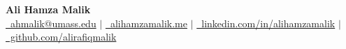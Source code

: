 \begin{center}
    \textbf{\huge Ali Hamza Malik} \\ \vspace{5pt}
    \small
    \href{mailto:ahmalik@umass.edu}{\raisebox{-0.05\height}\faEnvelope \ ahmalik@umass.edu}
      $|$ \href{https://alihamzamalik.me/}{{\raisebox{-0.05\height}\faGlobeAmericas\ alihamzamalik.me}}
      $|$
      \href{https://linkedin.com/in/alihamzamalik}{\raisebox{-0.05\height}\faLinkedin\ linkedin.com/in/alihamzamalik}
      $|$ \href{https://github.com/alirafiqmalik}{\raisebox{-0.05\height}\faGithub  \ github.com/alirafiqmalik} 
      \vspace{-6pt}
\end{center}

